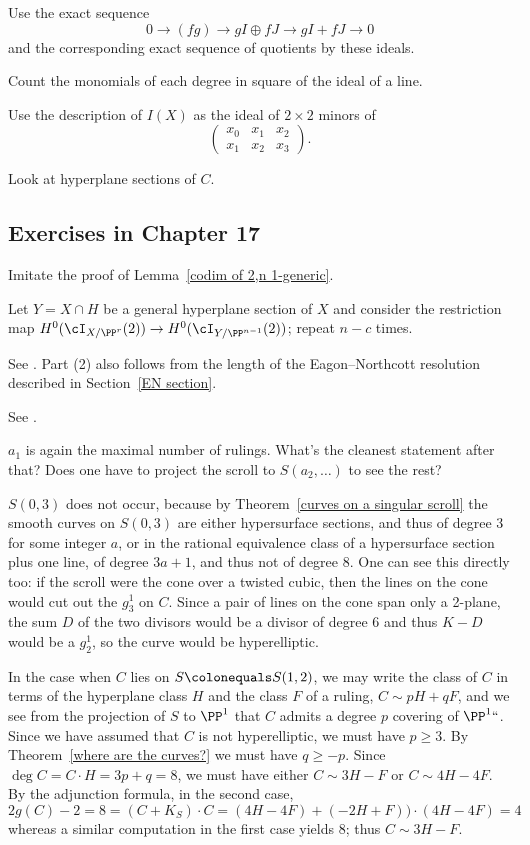 Use the exact sequence
$$
0\to (fg) \to gI \oplus fJ \to gI+fJ \to 0
$$
and the corresponding exact sequence of quotients by these ideals.

Count the monomials of each degree in square of the ideal of a line.

Use the description of $I(X)$ as the ideal of $2\times 2$ minors of
$$
\begin{pmatrix}
x_0 &x_1&x_2\\
x_1& x_2& x_3
\end{pmatrix}
.
$$

Look at hyperplane sections of $C$.

\subsection*{Exercises in Chapter 17}

Imitate the proof of Lemma~\ref{codim of 2,n 1-generic}.

Let $Y = X \cap H$ be a general hyperplane section of $X$
and consider the restriction map $H^0(\cI_{X/\PP^r}(2)) \to
H^0(\cI_{Y/\PP^{n-1}}(2))$; repeat $n-c$ times.

See \cite[Section V.1]{Hartshorne1977}.
Part (2) also follows from
the length of the 
%
Eagon--Northcott resolution
described in Section~\ref{EN section}.

See \cite[Section 3c]{MR685427}.

$a_1$ is again the maximal number of rulings. What's the cleanest
statement after that? Does one have
to project the scroll to $S(a_2, \dots)$ to see the rest?

$S(0,3)$ does not occur, because by Theorem~\ref{curves on a
singular scroll} the smooth curves on $S(0,3)$ are either hypersurface
sections, and thus of degree $3$ for
some integer $a$, or in the rational equivalence class of a hypersurface
section plus one line,
of degree $3a+1$, and thus not of degree 8. One can see this directly too:
if the scroll were the cone over
a twisted cubic, then the lines on the cone would cut out the $g^1_3$
on $C$. Since a pair of lines on the cone span
only a 2-plane, the sum $D$ of the two divisors would be a divisor of
degree 6  and thus $K-D$ would be a $g^1_2$,
so the curve would be hyperelliptic.

In the case when $C$ lies on $S \colonequals  S(1,2)$, we may write
the class of $C$ in terms of the hyperplane class $H$ and the class $F$
of a ruling, $C\sim pH+qF$, and we see from the
projection of $S$ to $\PP^1$ that $C$ admits
a degree $p$ covering of $\PP^1` `$. Since we have assumed that $C$
is not hyperelliptic,
we must have $p\geq 3$. By Theorem~\ref{where are the curves?} we
must have
$q\geq -p$. Since $\deg C = C\cdot H = 3p+q = 8$, we must have either
$C\sim 3H-F$ or $C\sim 4H-4F$. By the adjunction formula, in the second
case,
$$
2g(C)-2 = 8 = (C+K_S)\cdot C = (4H-4F)+(-2H+F))\cdot(4H-4F) =4
$$
whereas a similar computation in the first case yields 8; thus $C\sim
3H-F$.

